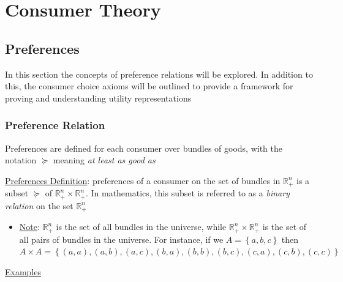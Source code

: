 \documentclass{article}
\begin{document}
\newpage

\section{Consumer Theory}

\vspace{2.5mm}
\subsection{Preferences}
In this section the concepts of preference relations will be explored. In addition to this, the consumer choice axioms will be outlined to provide a framework for proving and understanding utility representations \par
\vspace{6mm}
\subsubsection{Preference Relation}
Preferences are defined for each consumer over bundles of goods, with the notation $\succeq$ meaning \textit{at least as good as} \par \vspace{0.3em}
  \underline{Preferences Definition}: preferences of a consumer on the set of bundles in $\mathbb{R}_{+}^{n}$ is a subset $\succeq$ of $\mathbb{R}_{+}^{n} \times \mathbb{R}_{+}^{n}$. In mathematics, this subset is referred to as a \textit{binary relation} on the set $\mathbb{R}_{+}^{n}$
  \begin{itemize}
    \item  \underline{Note}: $\mathbb{R}_{+}^{n}$ is the set of all bundles in the universe, while $\mathbb{R}_{+}^{n} \times \mathbb{R}_{+}^{n}$ is the set of all pairs of bundles in the universe. For instance, if we $A = \left\{a, b, c\right\}$ then  $A \times A = \left\{(a,a), (a,b), (a,c), (b,a), (b,b), (b,c), (c,a), (c,b), (c,c) \right\}$
  \end{itemize}
  \par
  \underline{Examples}
\end{document}

